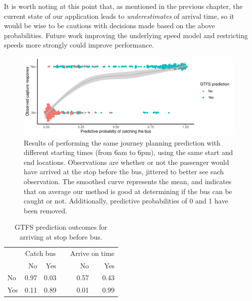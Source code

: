 It is worth noting at this point that, as mentioned in the previous chapter, the current state of our application leads to \emph{underestimates} of arrival time, so it would be wise to be cautious with decisions made based on the above probabilities. Future work improving the underlying speed model and restricting speeds more strongly could improve performance.




\begin{knitrout}\small
{}\color{fgcolor}\begin{figure}

{\centering \includegraphics[width=\textwidth]{figure/eta_journey_results_avg-1} 

}

\caption[Results of performing the same journey planning prediction with different starting times (from 6am to 6pm), using the same start and end locations]{Results of performing the same journey planning prediction with different starting times (from 6am to 6pm), using the same start and end locations. Observations are whether or not the passenger would have arrived at the stop before the bus, jittered to better see each observation. The smoothed curve represents the mean, and indicates that on average our method is good at determining if the bus can be caught or not. Additionally, predictive probabilities of 0 and 1 have been removed.}\label{fig:eta_journey_results_avg}
\end{figure}

\begin{table}

\caption{\label{tab:eta_journey_results_avg}GTFS prediction outcomes for arriving at stop before bus.}
\centering
\fontsize{8}{10}\selectfont
\begin{tabular}[t]{lrrrrr}
\toprule
\multicolumn{1}{c}{ } & \multicolumn{2}{c}{Catch bus} & \multicolumn{1}{c}{} & \multicolumn{2}{c}{Arrive on time} \\
\cmidrule(l{3pt}r{3pt}){2-3} \cmidrule(l{3pt}r{3pt}){5-6}
  & No & Yes &  & No & Yes\\
\midrule
No & 0.97 & 0.03 &  & 0.57 & 0.43\\
Yes & 0.11 & 0.89 &  & 0.01 & 0.99\\
\bottomrule
\end{tabular}
\end{table}


\end{knitrout}

